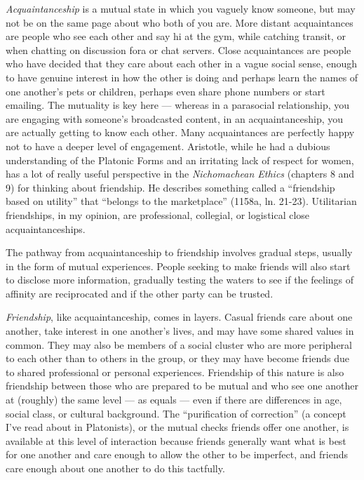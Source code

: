 \documentclass[
]{book}
\begin{document}
\emph{Acquaintanceship} is a mutual state in which you vaguely know someone, but may not be on the same page about who both of you are. More distant acquaintances are people who see each other and say hi at the gym, while catching transit, or when chatting on discussion fora or chat servers. Close acquaintances are people who have decided that they care about each other in a vague social sense, enough to have genuine interest in how the other is doing and perhaps learn the names of one another's pets or children, perhaps even share phone numbers or start emailing. The mutuality is key here --- whereas in a parasocial relationship, you are engaging with someone's broadcasted content, in an acquaintanceship, you are actually getting to know each other. Many acquaintances are perfectly happy not to have a deeper level of engagement. Aristotle, while he had a dubious understanding of the Platonic Forms and an irritating lack of respect for women, has a lot of really useful perspective in the \emph{Nichomachean Ethics} (chapters 8 and 9) for thinking about friendship. He describes something called a ``friendship based on utility'' that ``belongs to the marketplace'' (1158a, ln. 21-23). Utilitarian friendships, in my opinion, are professional, collegial, or logistical close acquaintanceships.

The pathway from acquaintanceship to friendship involves gradual steps, usually in the form of mutual experiences. People seeking to make friends will also start to disclose more information, gradually testing the waters to see if the feelings of affinity are reciprocated and if the other party can be trusted.

\emph{Friendship}, like acquaintanceship, comes in layers. Casual friends care about one another, take interest in one another's lives, and may have some shared values in common. They may also be members of a social cluster who are more peripheral to each other than to others in the group, or they may have become friends due to shared professional or personal experiences. Friendship of this nature is also friendship between those who are prepared to be mutual and who see one another at (roughly) the same level --- as equals --- even if there are differences in age, social class, or cultural background. The ``purification of correction'' (a concept I've read about in Platonists), or the mutual checks friends offer one another, is available at this level of interaction because friends generally want what is best for one another and care enough to allow the other to be imperfect, and friends care enough about one another to do this tactfully.
\end{document}
